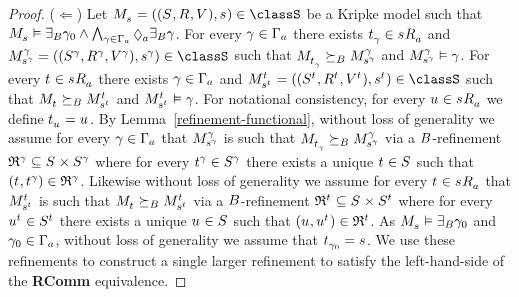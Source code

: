 \begin{proof}
($\Leftarrow$)
Let $\kPModelAndTuple{\kStateS} \in \classS$ be a Kripke model such that $\kPModel{\kStateS} \entails \somerefsBs \gamma_0 \land \bigwedge_{\gamma \in \Gamma_\agentA} \possibleA \somerefsBs \gamma$.
For every $\gamma \in \Gamma_\agentA$ there exists $\kStateT_\gamma \in \kSuccessorsA{\kStateS}$ and $\kPModelAndTuple[\gamma]{\kStateS[\gamma]} \in \classS$ such that $\kPModel{\kStateT_\gamma} \simulatesBs \kPModel[\gamma]{\kStateS[\gamma]}$ and $\kPModel[\gamma]{\kStateS[\gamma]} \entails \gamma$.
For every $\kStateT \in \kSuccessorsA{\kStateS}$ there exists $\gamma \in \Gamma_\agentA$ and $\kPModelAndTuple[\kStateT]{\kStateS[\kStateT]} \in \classS$ such that $\kPModel{\kStateT} \simulatesBs \kPModel[\kStateT]{\kStateS[\kStateT]}$ and $\kPModel[\kStateT]{\kStateS[\kStateT]} \entails \gamma$.
For notational consistency, for every $\kStateU \in \kSuccessorsA{\kStateS}$ we define $\kStateT_{\kStateU} = \kStateU$.
By Lemma~\ref{refinement-functional}, without loss of generality we assume for every $\gamma \in \Gamma_\agentA$ that $\kPModel[\gamma]{\kStateS[\gamma]}$ is such that $\kPModel{\kStateT_\gamma} \simulatesBs \kPModel[\gamma]{\kStateS[\gamma]}$ via a $\agentsB$-refinement $\refinement^{\gamma} \subseteq \kStates \times \kStates[\gamma]$ where for every $\kStateT[\gamma] \in \kStates[\gamma]$ there exists a unique $\kStateT \in \kStates$ such that $(\kStateT, \kStateT[\gamma]) \in \refinement^{\gamma}$.
Likewise without loss of generality we assume for every $\kStateT \in \kSuccessorsA{\kStateS}$ that $\kPModel[\kStateT]{\kStateS[\kStateT]}$ is such that $\kPModel{\kStateT} \simulatesBs \kPModel[\kStateT]{\kStateS[\kStateT]}$ via a $\agentsB$-refinement $\refinement^{\kStateT} \subseteq \kStates \times \kStates[\kStateT]$ where for every $\kStateU[\kStateT] \in \kStates[\kStateT]$ there exists a unique $\kStateU \in \kStates$ such that $(\kStateU, \kStateU[\kStateT]) \in \refinement^{\kStateT}$.
As $\kPModel{\kStateS} \entails \somerefsBs \gamma_0$ and $\gamma_0 \in \Gamma_\agentA$, without loss of generality we assume that $\kStateT_{\gamma_0} = \kStateS$.
We use these refinements to construct a single larger refinement to satisfy the left-hand-side of the {\bf RComm} equivalence.


\end{proof}
